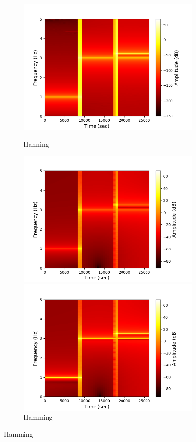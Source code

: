 \begin{figure}[H]
\centering
\begin{subfigure}{0.49\textwidth}
\centering
\includegraphics[width=\textwidth]{figures/stft_windows/hanning_10000.png}
\caption{Hanning}
\label{fig:stft_hanning}
\includegraphics[width=\textwidth]{figures/stft_windows/hamming_10000.png}
\caption{Hamming}
\label{fig:stft_hamming}
\includegraphics[width=\textwidth]{figures/stft_windows/kaiser/10000/4.png}

\end{subfigure}
\end{figure}
